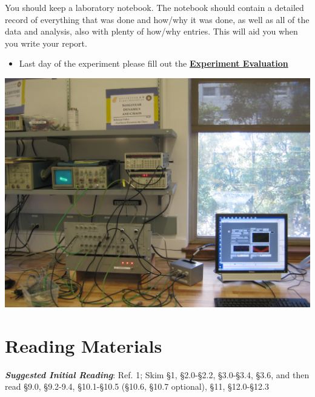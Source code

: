 \documentclass{../lab}
\begin{document}
You should keep a laboratory notebook. The notebook should contain a detailed record of everything that was done and how/why it was done, as well as all of the data and analysis, also with plenty of how/why entries. This will aid you when you write your report.

\begin{itemize}
    \item Last day of the experiment please fill out the \href{\ExperimentEvaluation}{\textbf{Experiment Evaluation}}

\end{itemize}

\noindent
\href{http://experimentationlab.berkeley.edu/sites/default/files/images/NLD_3516.jpg}{\includegraphics[width=0.33\linewidth,keepaspectratio]{images/NLD_3516.jpg}}

\section{Reading Materials}

\emph{\textbf{Suggested Initial Reading}}: Ref. 1; Skim §1, §2.0-§2.2, §3.0-§3.4, §3.6, and then read §9.0, §9.2-9.4, §10.1-§10.5 (§10.6, §10.7 optional), §11, §12.0-§12.3
\end{document}
